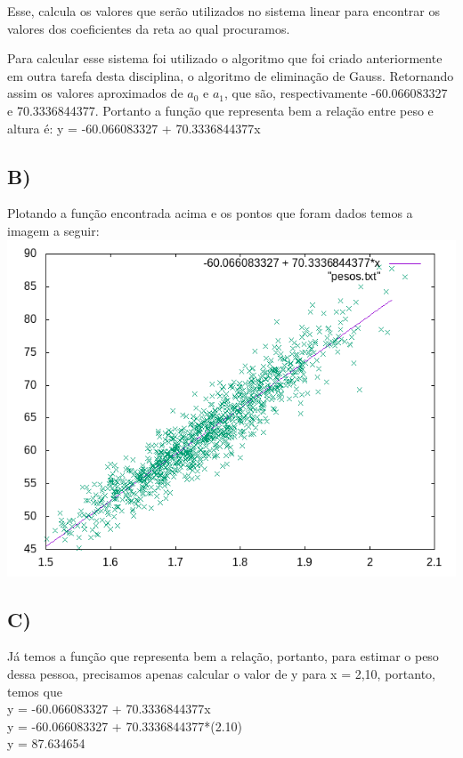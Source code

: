 \documentclass{article}
\begin{document}
    Esse, calcula os valores que serão utilizados no sistema linear para encontrar os valores dos coeficientes da reta ao qual procuramos.
    
    Para calcular esse sistema foi utilizado o algoritmo que foi criado anteriormente em outra tarefa desta disciplina, o algoritmo de eliminação de Gauss. Retornando assim os valores aproximados de $a_0$ e $a_1$, que são, respectivamente -60.066083327 e 70.3336844377. Portanto a função que representa bem a relação entre peso e altura é: y = -60.066083327 + 70.3336844377x
    
    \subsection*{B)}Plotando a função encontrada acima e os pontos que foram dados temos a imagem a seguir:\\
    \includegraphics[scale = 0.85]{relacao.png}\\
    
    \subsection*{C)}
    \hspace{0.5cm}Já temos a função que representa bem a relação, portanto, para estimar o peso dessa pessoa, precisamos apenas calcular o valor de y para x = 2,10, portanto, temos que\\
    y = -60.066083327 + 70.3336844377x\\
    y = -60.066083327 + 70.3336844377*(2.10)\\
    y = 87.634654\\
    
\end{document}
